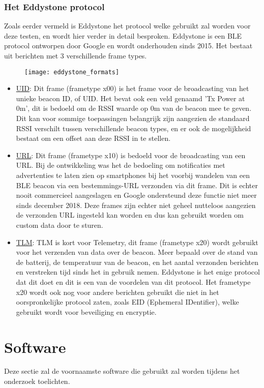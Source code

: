 \subsubsection{Het Eddystone protocol}
Zoals eerder vermeld is Eddystone het protocol welke gebruikt zal worden voor deze testen, en wordt hier verder in detail besproken. Eddystone is een BLE protocol ontworpen door Google en wordt onderhouden sinds 2015. Het bestaat uit berichten met 3 verschillende frame types. 
\begin{figure}[h]
	\texttt{[image: eddystone\_formats]}
	\centering
\end{figure}
\begin{itemize}
	\item \underline{UID}:
	Dit frame (frametype x00) is het frame voor de broadcasting van het unieke beacon ID, of UID. Het bevat ook een veld genaamd 'Tx Power at 0m', dit is bedoeld om de RSSI waarde op 0m van de beacon mee te geven. Dit kan voor sommige toepassingen belangrijk zijn aangezien de standaard RSSI verschilt tussen verschillende beacon types, en er ook de mogelijkheid bestaat om een offset aan deze RSSI in te stellen.
	\item \underline{URL}:
	Dit frame (frametype x10) is bedoeld voor de broadcasting van een URL. Bij de ontwikkeling was het de bedoeling om notificaties met advertenties te laten zien op smartphones bij het voorbij wandelen van een BLE beacon via een bestemmings-URL verzonden via dit frame. Dit is echter nooit commercieel aangeslagen en Google ondersteund deze functie niet meer sinds december 2018.\autocite{Estimote2018} Deze frames zijn echter niet geheel nutteloos aangezien de verzonden URL ingesteld kan worden en dus kan gebruikt worden om custom data door te sturen.
	\item \underline{TLM}:
	TLM is kort voor Telemetry, dit frame (frametype x20) wordt gebruikt voor het verzenden van data over de beacon. Meer bepaald over de stand van de batterij, de temperatuur van de beacon, en het aantal verzonden berichten en verstreken tijd sinds het in gebruik nemen. Eddystone is het enige protocol dat dit doet en dit is een van de voordelen van dit protocol. Het frametype x20 wordt ook nog voor andere berichten gebruikt die niet in het oorspronkelijke protocol zaten, zoals EID (Ephemeral IDentifier), welke gebruikt wordt voor beveiliging en encryptie.
\end{itemize}\autocite{Google2018}

\section{Software}
\label{sec:Software}
Deze sectie zal de voornaamste software die gebruikt zal worden tijdens het onderzoek toelichten.

